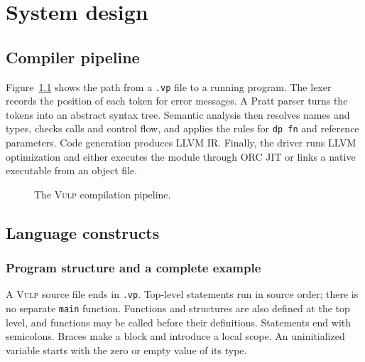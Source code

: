 \documentclass[12pt,a4paper]{report}
\newcommand{\vulp}{\textsc{Vulp}}
\begin{document}
\chapter{System design}\label{sec:system}
\section{Compiler pipeline}
Figure~\ref{fig:pipeline} shows the path from a \texttt{.vp} file to a running program. The lexer records the position of each token for error messages. A Pratt parser turns the tokens into an abstract syntax tree. Semantic analysis then resolves names and types, checks calls and control flow, and applies the rules for \texttt{dp fn} and reference parameters. Code generation produces LLVM IR. Finally, the driver runs LLVM optimization and either executes the module through ORC JIT or links a native executable from an object file.

\begin{figure}[htbp]
\centering
\setlength{\fboxsep}{8pt}
\caption{The \vulp{} compilation pipeline.}
\label{fig:pipeline}
\end{figure}

\section{Language constructs}
\subsection{Program structure and a complete example}
A \vulp{} source file ends in \texttt{.vp}. Top-level statements run in source order; there is no separate \texttt{main} function. Functions and structures are also defined at the top level, and functions may be called before their definitions. Statements end with semicolons. Braces make a block and introduce a local scope. An uninitialized variable starts with the zero or empty value of its type.
\end{document}

